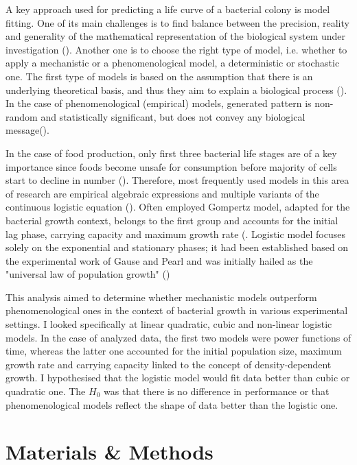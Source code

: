 \documentclass[a4paper,11pt]{article}
\begin{document}
A key approach used for predicting a life curve of a bacterial colony is model fitting. One of its main challenges is to find balance between the precision, reality and generality of the mathematical representation of the biological system under investigation (\cite{levins1966strategy}). Another one is to choose the right type of model, i.e. whether to apply a mechanistic or a phenomenological model, a deterministic or stochastic one. The first type of models is based on the assumption that there is an underlying theoretical basis, and thus they aim to explain a biological process (\cite{peleg2011microbial}). In the case of phenomenological (empirical) models, generated pattern is non-random and statistically significant, but does not convey any biological message(\cite{peleg2011microbial}).\par

In the case of food production, only first three bacterial life stages are of a key importance since foods become unsafe for consumption before majority of cells start to decline in number (\cite{peleg2011microbial}). Therefore, most frequently used models in this area of research are empirical algebraic expressions and multiple variants of the continuous logistic equation (\cite{peleg2011microbial}). Often employed Gompertz model, adapted for the bacterial growth context, belongs to the first group and accounts for the initial lag phase, carrying capacity and maximum growth rate (\cite{buchanan1997simple}. Logistic model focuses solely on the exponential and stationary phases; it had been established based on the experimental work of Gause and Pearl and was initially hailed as the "universal law of population growth" (\cite{krebs1985ecology})\par

This analysis aimed to determine whether mechanistic models outperform phenomenological ones in the context of bacterial growth in various experimental settings. I looked specifically at linear quadratic, cubic and non-linear logistic models. In the case of analyzed data, the first two models were power functions of time, whereas the latter one accounted for the initial population size, maximum growth rate and carrying capacity linked to the concept of density-dependent growth. I hypothesised that the logistic model would fit data better than cubic or quadratic one. The $H_{0}$ was that there is no difference in performance or that phenomenological models reflect the shape of data better than the logistic one.

    \section{Materials \& Methods}
    
\end{document}
